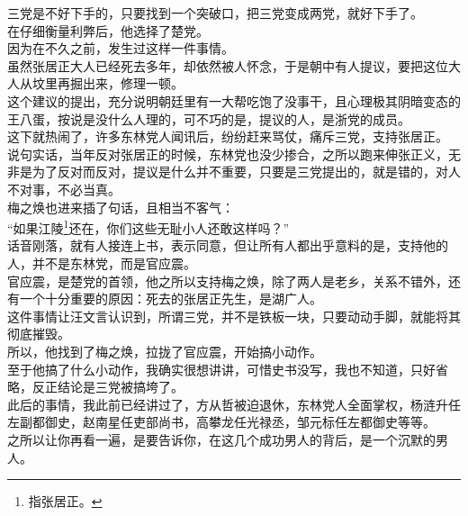 \begin{multicols}{\theparacolNo}
三党是不好下手的，只要找到一个突破口，把三党变成两党，就好下手了。\\

在仔细衡量利弊后，他选择了楚党。\\

因为在不久之前，发生过这样一件事情。\\

虽然张居正大人已经死去多年，却依然被人怀念，于是朝中有人提议，要把这位大人从坟里再掘出来，修理一顿。\\

这个建议的提出，充分说明朝廷里有一大帮吃饱了没事干，且心理极其阴暗变态的王八蛋，按说是没什么人理的，可不巧的是，提议的人，是浙党的成员。\\

这下就热闹了，许多东林党人闻讯后，纷纷赶来骂仗，痛斥三党，支持张居正。\\

说句实话，当年反对张居正的时候，东林党也没少掺合，之所以跑来伸张正义，无非是为了反对而反对，提议是什么并不重要，只要是三党提出的，就是错的，对人不对事，不必当真。\\

梅之焕也进来插了句话，且相当不客气：\\

“如果江陵\footnote{指张居正。}还在，你们这些无耻小人还敢这样吗？”\\

话音刚落，就有人接连上书，表示同意，但让所有人都出乎意料的是，支持他的人，并不是东林党，而是官应震。\\

官应震，是楚党的首领，他之所以支持梅之焕，除了两人是老乡，关系不错外，还有一个十分重要的原因：死去的张居正先生，是湖广人。\\

这件事情让汪文言认识到，所谓三党，并不是铁板一块，只要动动手脚，就能将其彻底摧毁。\\

所以，他找到了梅之焕，拉拢了官应震，开始搞小动作。\\

至于他搞了什么小动作，我确实很想讲讲，可惜史书没写，我也不知道，只好省略，反正结论是三党被搞垮了。\\

此后的事情，我此前已经讲过了，方从哲被迫退休，东林党人全面掌权，杨涟升任左副都御史，赵南星任吏部尚书，高攀龙任光禄丞，邹元标任左都御史等等。\\

之所以让你再看一遍，是要告诉你，在这几个成功男人的背后，是一个沉默的男人。\\

\ifnum{}
	\end{multicols}
\fi
\newpage
